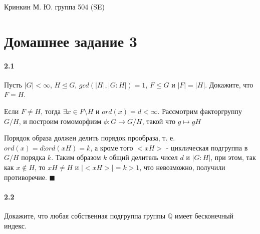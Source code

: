 \documentclass[a4paper,12pt]{article}
\begin{document}
\sloppy

\lstset{
	basicstyle=\small,
	stringstyle=\ttfamily,
	showstringspaces=false,
	columns=fixed,
	breaklines=true,
	numbers=right,
	numberstyle=\tiny
}

\newtheorem{Def}{Определение}[section]
\newtheorem{Th}{Теорема}
\newtheorem{Lem}[Th]{Лемма}
\newenvironment{Proof}
	{\par\noindent{\bf Доказательство.}}
	{\hfill$\scriptstyle\blacksquare$}
\newenvironment{Solution}
	{\par\noindent{\bf Решение.}}
	{\hfill$\scriptstyle\blacksquare$}


\begin{flushright}
	Кринкин М. Ю. группа 504 (SE)
\end{flushright}

\section{Домашнее задание 3}

\paragraph{2.1} Пусть $\left|G\right| < \infty$, $H \trianglelefteq G$, $gcd\left(\left|H\right|,\left|G:H\right|\right) = 1$, $F \le G$ и $\left|F\right| = \left|H\right|$. Докажите, что $F = H$.

\begin{Solution}
Если $F \not= H$, тогда $\exists x \in F \setminus H$ и $ord\left(x\right) = d < \infty$. Рассмотрим факторгруппу $G/H$, и построим гомоморфизм $\phi : G \rightarrow G/H$, такой что $g \mapsto gH$

Порядок образа должен делить порядок прообраза, т. е. $ord\left(x\right) = d \vdots ord\left(xH\right) = k$, а кроме того $<xH>$ - циклическая подгруппа в $G/H$ порядка $k$. Таким образом $k$ общий делитель чисел $d$ и $\left|G : H\right|$, при этом, так как $x \not\in H$, то $xH \not= H$ и $\left|<xH>\right| = k > 1$, что невозможно, получили противоречие.
\end{Solution}

\paragraph{2.2} Докажите, что любая собственная подгруппа группы $\mathbb{Q}$ имеет бесконечный индекс.
\end{document}
